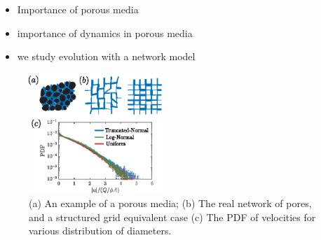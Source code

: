 \documentclass[%
 reprint,
 amsmath,amssymb,
 aps,
]{revtex4-1}
\begin{document}





\begin{itemize}
\item Importance of porous media
\item importance of dynamics in porous media
\item we study evolution with a network model
\end{itemize}



\begin{figure}[h]
    \includegraphics[width = 0.45\textwidth]{Figs/Fig1.eps}
    \caption{(a) An example of a porous media; (b) The real network of pores, and a structured grid equivalent case (c) The PDF of velocities for various distribution of diameters.}\label{fig:fig1}
\end{figure}
\end{document}
